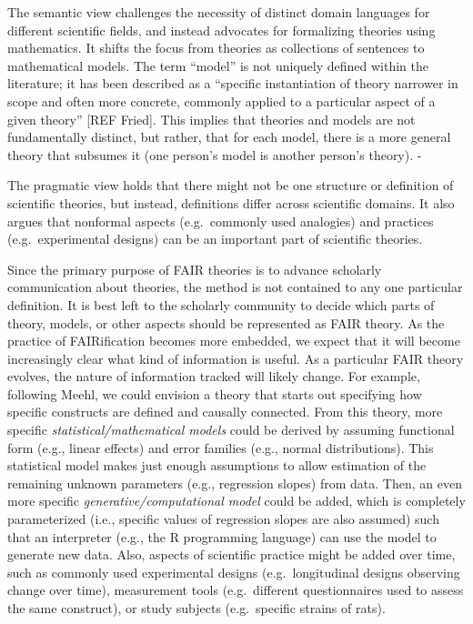 \documentclass[
  man,floatsintext]{apa6}
\begin{document}
The semantic view challenges the necessity of distinct domain languages for different scientific fields, and instead advocates for formalizing theories using mathematics.
It shifts the focus from theories as collections of sentences to mathematical models.
The term ``model'' is not uniquely defined within the literature;
it has been described as a ``specific instantiation of theory narrower in scope and often more concrete, commonly applied to a particular aspect of a given theory'' {[}REF Fried{]}.
This implies that theories and models are not fundamentally distinct, but rather, that for each model, there is a more general theory that subsumes it (one person's model is another person's theory).
-

The pragmatic view holds that there might not be one structure or definition of scientific theories, but instead, definitions differ across scientific domains.
It also argues that nonformal aspects (e.g.~commonly used analogies) and practices (e.g.~experimental designs) can be an important part of scientific theories.

Since the primary purpose of FAIR theories is to advance scholarly communication about theories,
the method is not contained to any one particular definition.
It is best left to the scholarly community to decide which parts of theory, models, or other aspects should be represented as FAIR theory.
As the practice of FAIRification becomes more embedded,
we expect that it will become increasingly clear what kind of information is useful.
As a particular FAIR theory evolves, the nature of information tracked will likely change.
For example, following Meehl, we could envision a theory that starts out specifying how specific constructs are defined and causally connected.
From this theory, more specific \emph{statistical/mathematical models} could be derived by assuming functional form (e.g., linear effects) and error families (e.g., normal distributions).
This statistical model makes just enough assumptions to allow estimation of the remaining unknown parameters (e.g., regression slopes) from data.
Then, an even more specific \emph{generative/computational model} could be added, which is completely parameterized (i.e., specific values of regression slopes are also assumed) such that an interpreter (e.g., the R programming language) can use the model to generate new data.
Also, aspects of scientific practice might be added over time, such as commonly used experimental designs (e.g.~longitudinal designs observing change over time), measurement tools (e.g.~different questionnaires used to assess the same construct), or study subjects (e.g.~specific strains of rats).
\end{document}
